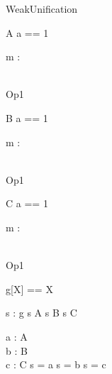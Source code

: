 \begin{zsection}
 \SECTION WeakUnification
\end{zsection}

\begin{class}{A}
  a == 1
  \begin{state}
    m : \nat
  \end{state}\\
  Op1 \sdef [x? : \nat]
\end{class}

\begin{class}{B}
  a == 1\\
  \begin{state}
    m : \nat
  \end{state}\\
  Op1 \sdef [x? : \nat]\\
\end{class}

\begin{class}{C}
  a == 1\\
  \begin{state}
    m : \nat
  \end{state}\\
  Op1 \sdef [x? : \nat]\\
\end{class}

\begin{zed}
  g[X] == X
\end{zed}

\begin{axdef}
  s : g
\where
  s \in A\lor
  s \in B\lor
  s \in C
\end{axdef}

\begin{axdef}
  a : A\\
  b : B\\
  c : C
\where
  s = a\lor
  s = b\lor
  s = c
\end{axdef}
